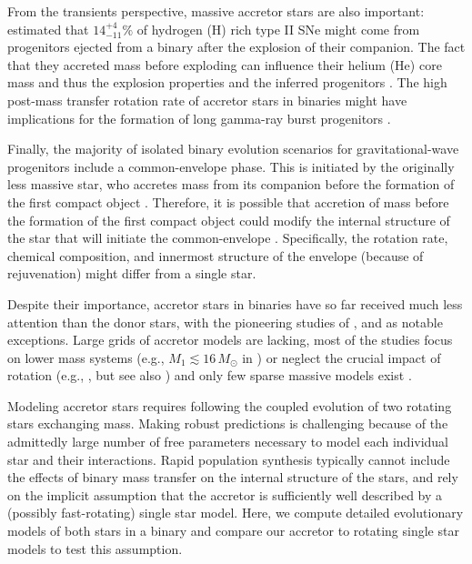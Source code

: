 \documentclass[twocolumn,twocolappendix,trackchanges]{aastex63}
\begin{document}
From the transients perspective, massive accretor stars are also
important: \cite{zapartas:19} estimated that $14_{-11}^{+4}\%$ of
hydrogen (H) rich
type II SNe might come from progenitors ejected from a binary after
the explosion of their companion. The fact that they accreted mass before exploding can
influence their helium (He) core mass and thus the explosion
properties and the inferred progenitors \citep{zapartas:21}. %
The high post-mass transfer rotation
rate of accretor stars in binaries might have implications for the
formation of long gamma-ray burst progenitors \citep[e.g.,][]{cantiello:07}.

Finally, the majority of isolated binary evolution scenarios for
gravitational-wave progenitors include a common-envelope
phase. This is initiated by the originally less massive star, who
accretes mass from its companion before the formation of the first compact object
\citep[e.g.,][]{belczynski:16nat, tauris:17,
  broekgaarden:21}. Therefore, it is possible that accretion of mass
before the formation of the first compact object could modify the
internal structure of the star that will initiate the common-envelope
\citep[e.g.,][]{law-smith:20, klencki:21}. Specifically, the
rotation rate, chemical composition, and innermost structure of the
envelope (because of rejuvenation) might differ from a single star.

Despite their importance, accretor stars in binaries have so far
received much less attention than the donor stars, with the pioneering
studies of \cite{ulrich:76, hellings:83, hellings:84}, and
\cite{braun:95} as notable exceptions. Large grids of accretor models
are lacking, most of the studies focus on lower mass systems
(e.g., $M_1\lesssim 16\,M_\odot$ in \citealt{vanrensbergen:11}) or
neglect the crucial impact of rotation (e.g., \citealt{sravan:19}, but see also
\citealt{wang:20}) and only few sparse massive models exist
\citep[e.g.,][]{cantiello:07}.

Modeling accretor stars requires following the coupled evolution of
two rotating stars exchanging mass. Making robust predictions is
challenging because of the admittedly large number of free parameters
necessary to model each individual star and their interactions. Rapid
population synthesis typically cannot include the effects of binary
mass transfer on the internal structure of the stars, and rely on the
implicit assumption that the accretor is sufficiently well described
by a (possibly fast-rotating) single star model. Here, we compute
detailed evolutionary models of both stars in a binary and compare our
accretor to rotating single star models to test this assumption.
\end{document}
